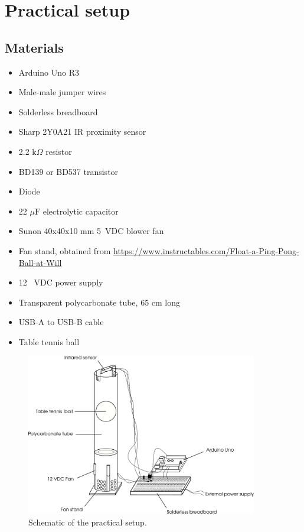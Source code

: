 \documentclass[10pt,twoside,openright]{article}
\begin{document}
\section{Practical setup}

\subsection{Materials}

\begin{itemize}
\itemsep0em 
\item Arduino Uno R3
\item Male-male jumper wires
\item Solderless breadboard
\item Sharp 2Y0A21 IR proximity sensor
\item 2.2 $\text{k}\Omega$ resistor
\item BD139 or BD537 transistor
\item Diode
\item 22 $\mu\text{F}$ electrolytic capacitor
\item Sunon 40x40x10 mm 5~VDC blower fan
\item Fan stand, obtained from \url{https://www.instructables.com/Float-a-Ping-Pong-Ball-at-Will}
\item 12~ VDC power supply
\item Transparent polycarbonate tube, 65 cm long
\item USB-A to USB-B cable
\item Table tennis ball
\end{itemize}

\begin{figure}[h!]
\centering
\includegraphics[width=0.9\textwidth]{setup_annot.pdf}
\caption{Schematic of the practical setup.}
\end{figure}
\end{document}
